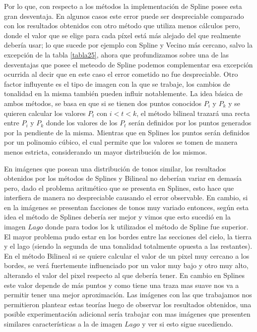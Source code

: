 \documentclass[a4paper]{article}
\begin{document}
Por lo que, con respecto a los métodos la implementación de Spline posee esta gran desventaja. En algunos casos este error puede ser despreciable comparado con los resultados obtenidos con otro método que utiliza menos cálculos pero, donde el valor que se elige para cada píxel está más alejado del que realmente debería usar; lo que sucede por ejemplo con Spline y Vecino m\'as cercano, salvo la excepción de la tabla \ref{tabla25}, ahora que profundizamos sobre una de las desventajas que posee el meteodo de Spline podemos complementar esa excepción ocurrida al decir que en este caso el error cometido no fue despreciable.
Otro factor influyente es el tipo de imagen con la que se trabaje, los cambios de tonalidad en la misma también pueden influir notablemente. La idea básica de ambos métodos, se basa en que si se tienen dos puntos conocidos $P_i$ y $P_k$ y se quieren calcular los valores $P_t$ con $i < t < k$, el método bilineal trazará una recta entre $P_i$ y $P_k$ donde los valores de los $P_t$ serán definidos por los puntos generados por la pendiente de la misma. Mientras que en Splines los puntos serán definidos por un polinomio cúbico, el cual permite que los valores se tomen de manera menos estricta, considerando un mayor distribución de los mismos.
\par En imágenes que posean una distribución de tonos similar, los resultados obtenidos por los métodos de Splines y Bilineal no deberían variar en demasía pero, dado el problema aritmético que se presenta en Splines, esto hace que interfiera de manera no despreciable causando el error observable. En cambio, si en la imágenes se presentan facciones de tonos muy variado entonces, según esta idea el método de Splines debería ser mejor y vimos que esto sucedió en la imagen $Lago$ donde para todos los k utilizados el método de Spline fue superior. El mayor problema pudo estar en los bordes entre las secciones del cielo, la tierra y el lago (siendo la segunda de una tonalidad totalmente opuesta a las restantes). En el método Bilineal si se quiere calcular el valor de un pixel muy cercano a los bordes, se verá fuertemente influenciado por un valor muy bajo y otro muy alto, alterando el valor del pixel respecto al que debería tener. En cambio en Splines este valor depende de m\'as puntos y como tiene una traza mas suave nos va a permitir tener una mejor aproximación. 
Las im\'agenes con las que trabajamos nos permitieron plantear estas teorías luego de observar los resultados obtenidos, una posible experimentación adicional sería trabajar con mas imágenes que presenten similares características a la de imagen $Lago$ y ver si esto sigue sucediendo.
\end{document}
